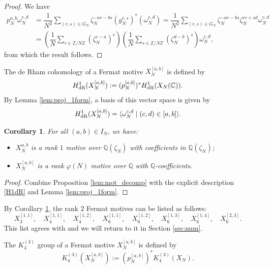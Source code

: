 \documentclass[11pt,a4,leqno]{amsart}
\theoremstyle{my theoremstyle}
\newtheorem{cor}[thm]{Corollary}
\theoremstyle{dfn}
\theoremstyle{remark}
\renewcommand{\1}{\mathbbm{1}}
\newcommand{\Z}{\mathbb{Z}}
\newcommand{\Q}{\mathbb{Q}}
\newcommand{\C}{\mathbb{C}}
\newcommand{\z}{\zeta}
\numberwithin{equation}{section}
\begin{document}
\begin{proof}
    We have 
    \begin{align*}
        p_N^{a,b} \omega_N^{c,d} &= \dfrac1{N^2} \sum_{(r, s) \in G_N} \zeta_N^{-ar-bs} (g_N^{r, s})^*(\omega_N^{c,d})  = \dfrac1{N^2} \sum_{(r, s) \in G_N} \zeta_N^{-ar-bs} \z_N^{rc+sd} \omega_N^{c,d} \\
        & = \left( \dfrac1{N} \sum_{r \in \Z/N\Z} (\zeta_N^{c-a})^r \right)\left( \dfrac1{N} \sum_{s \in \Z/N\Z} (\zeta_N^{d-b})^s \right) \omega_N^{c,d},
    \end{align*}
    from which the result follows.
\end{proof}

The de Rham cohomology of a Fermat motive $X_N^{[a, b]}$ is defined by 
$$H^1_{\rm dR}(X_N^{[a, b]}) := (p_N^{[a, b]})^* H^1_{\rm dR}(X_N(\C)). $$
By Lemma \ref{lem:proj_1form}, a basis of this vector space is given by 
\begin{equation}\label{basiseq}
    H^1_{\rm dR}(X_N^{[a, b]}) = \langle \omega_N^{c, d} \mid (c, d) \in [a, b] \rangle.
\end{equation}

\begin{cor}\label{cor:rank}
    For all $(a,b)\in I_N$, we have:
    \begin{itemize}
        \item $X^{a,b}_N$ is a rank $1$ motive over $\Q(\zeta_N)$ with coefficients in $\Q(\zeta_N)$;
        \item $X^{[a,b]}_N$ is a rank $\varphi(N)$ motive over $\Q$ with $\Q$-coefficients.
    \end{itemize}
\end{cor}

\begin{proof}
    Combine Proposition \ref{lem:mot_decomp} with the explicit description \eqref{H1dR} and Lemma \ref{lem:proj_1form}.
\end{proof}

By Corollary \ref{cor:rank}, the rank $2$ Fermat motives can be listed as follows: 
\begin{equation}\label{list:rank2}
X_3^{[1, 1]}, \quad X_4^{[1, 1]}, \quad X_4^{[1, 2]}, \quad X_6^{[1, 1]},\quad X_6^{[1, 2]}, \quad X_6^{[1, 3]}, \quad X_6^{[1, 4]}, \quad X_6^{[2, 3]}.
\end{equation}
This list agrees with \cite[Section 4.1]{Ots15} and we will return to it in Section \ref{sec:num}.

The $K_4^{(3)}$ group of a Fermat motive $X_N^{[a,b]}$ is defined by 
\begin{equation}\label{def:K4mot}
K_4^{(3)}(X^{[a,b]}_{N}):=(p_N^{[a,b]})^*K_4^{(3)}(X_{N}).
\end{equation}
\end{document}
